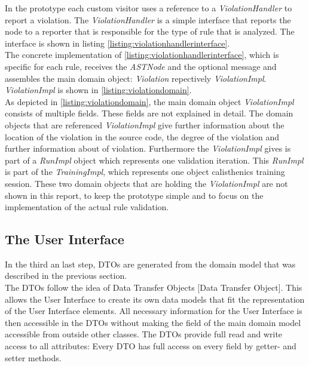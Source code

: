 In the prototype each custom visitor uses a reference to a \textit{ViolationHandler} to report a violation. The \textit{ViolationHandler} is a simple interface that reports the node to a reporter that is responsible for the type of rule that is analyzed. The interface is shown in listing \ref{listing:violationhandlerinterface}. 
\\

The concrete implementation of \ref{listing:violationhandlerinterface}, which is specific for each rule, receives the \textit{ASTNode} and the optional message and assembles the main domain object: \textit{Violation} repectively \textit{ViolationImpl}. \textit{ViolationImpl} is shown in \ref{listing:violationdomain}.
\\

As depicted in \ref{listing:violationdomain}, the main domain object \textit{ViolationImpl} consists of multiple fields. These fields are not explained in detail. The domain objects that are referenced \textit{ViolationImpl} give further information about the location of the violation in the source code, the degree of the violation and further information about of violation. Furthermore the \textit{ViolationImpl} gives is part of a \textit{RunImpl} object which represents one validation iteration. This \textit{RunImpl} is part of the \textit{TrainingImpl}, which represents one object calisthenics training session. These two domain objects that are holding the \textit{ViolationImpl} are not shown in this report, to keep the prototype simple and to focus on the implementation of the actual rule validation. 
\\

\subsection*{The User Interface}
In the third an last step, \ac{DTO}s are generated from the domain model that was described in the previous section. 
\\

The \ac{DTO}s follow the idea of Data Transfer Objects \cite{wiki}[Data Transfer Object]. This allows the User Interface to create its own data models that fit the representation of the User Interface elements. All necessary information for the User Interface is then accessible in the \ac{DTO}s without making the field of the main domain model accessible from outside other classes. The \ac{DTO}s provide full read and write access to all attributes: Every \ac{DTO} has full access on every field by getter- and setter methods. 
\\

